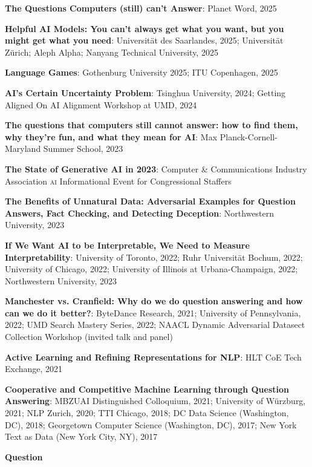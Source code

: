 {{  \begin{enumerate*}
  	\item {\bf The Questions Computers (still) can't Answer}: Planet Word, 2025
  	\item {\bf Helpful AI Models: You can't always get what you want, but you
  		might get what you need}: Universit\"at des
              Saarlandes, 2025;  Universit\"at Z\"urich; Aleph Alpha; Nanyang Technical University, 2025
  	\item {\bf Language Games}: Gothenburg University 2025; ITU Copenhagen, 2025
    \item {\bf AI's Certain Uncertainty Problem}: Tsinghua University,
      2024; Getting Aligned On
      AI Alignment Workshop at UMD, 2024
    \item {\bf The questions that computers still cannot answer: how to find
    them, why they’re fun, and what they mean for AI}: Max
    Planck-Cornell-Maryland Summer School, 2023
    \item {\bf The State of Generative AI in 2023}: Computer \& Communications
    Industry Association \textsc{ai} Informational Event for Congressional Staffers
    \item {\bf The Benefits of Unnatural Data: Adversarial Examples for
Question Answers, Fact Checking, and Detecting Deception}: Northwestern
University, 2023
    \item {\bf If We Want AI to be Interpretable, We Need to Measure
        Interpretability}: University of Toronto, 2022; Ruhr
      Universit\"at Bochum, 2022; University of Chicago, 2022;
      University of Illinois at Urbana-Champaign, 2022; Northwestern
        University, 2023
    \item {\bf Manchester vs. Cranfield: Why do we do question answering and
how can we do it better?}: ByteDance Research, 2021; University of
Pennsylvania, 2022; UMD Search Mastery Series, 2022; NAACL Dynamic
Adversarial Datasect Collection Workshop (invited talk and panel)
    \item {\bf Active Learning and Refining Representations for NLP}:
      HLT CoE Tech Exchange, 2021
\item {\bf Cooperative and Competitive Machine Learning through
    Question Answering}: MBZUAI Distinguished Colloquium, 2021;
  University of W\"urzburg, 2021; NLP Zurich, 2020; TTI Chicago, 2018; DC Data Science (Washington, DC), 2018; Georgetown Computer Science (Washington, DC),
  2017; New York Text as Data (New York City, NY), 2017
  \item {\bf Question
}
\end{enumerate*}}}
